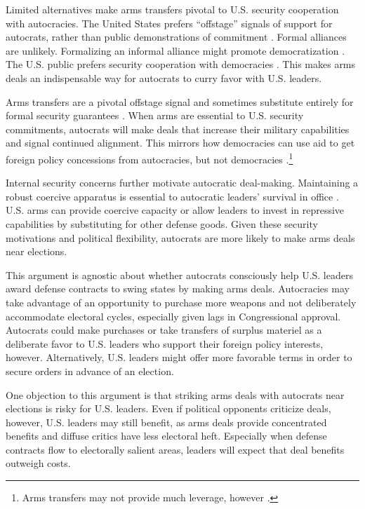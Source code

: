 \documentclass[12pt]{article}
\begin{document}
Limited alternatives make arms transfers pivotal to U.S. security cooperation with autocracies.  
The United States prefers ``offstage'' signals of support for autocrats, rather than public demonstrations of commitment \citep{McManusYarhi-Milo2017}.
Formal alliances are unlikely.  
Formalizing an informal alliance might promote democratization \citep{GiblerWolford2006}.
The U.S. public prefers security cooperation with democracies \citep{Alley2023}. 
This makes arms deals an indispensable way for autocrats to curry favor with U.S. leaders.


Arms transfers are a pivotal offstage signal and sometimes substitute entirely for formal security guarantees \citep{Yarhi-Miloetal2016}. 
When arms are essential to U.S. security commitments, autocrats will make deals that increase their military capabilities and signal continued alignment.
This mirrors how democracies can use aid to get foreign policy concessions from autocracies, but not democracies \citep{BDMSmith2009}.\footnote{Arms transfers may not provide much leverage, however \citep{Spindel2023}.}


Internal security concerns further motivate autocratic deal-making. 
Maintaining a robust coercive apparatus is essential to autocratic leaders' survival in office \citep{Boix2008}. 
U.S. arms can provide coercive capacity or allow leaders to invest in repressive capabilities by substituting for other defense goods. 
Given these security motivations and political flexibility, autocrats are more likely to make arms deals near elections.


This argument is agnostic about whether autocrats consciously help U.S. leaders award defense contracts to swing states by making arms deals.
Autocracies may take advantage of an opportunity to purchase more weapons and not deliberately accommodate electoral cycles, especially given lags in Congressional approval.
Autocrats could make purchases or take transfers of surplus materiel as a deliberate favor to U.S. leaders who support their foreign policy interests, however. 
Alternatively, U.S. leaders might offer more favorable terms in order to secure orders in advance of an election.


One objection to this argument is that striking arms deals with autocrats near elections is risky for U.S. leaders. 
Even if political opponents criticize deals, however, U.S. leaders may still benefit, as arms deals provide concentrated benefits and diffuse critics have less electoral heft.
Especially when defense contracts flow to electorally salient areas, leaders will expect that deal benefits outweigh costs. 
\end{document}
